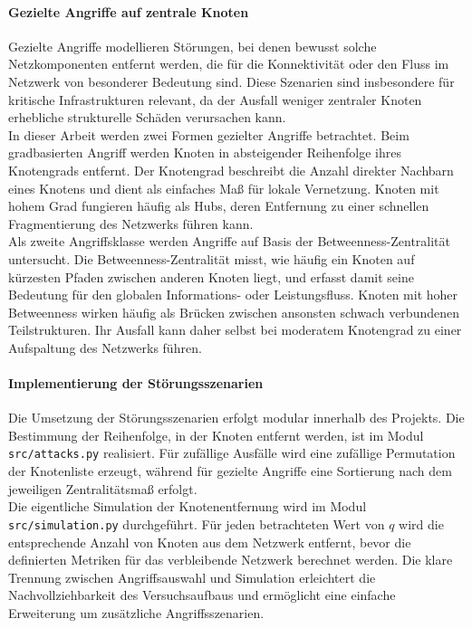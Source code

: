 \paragraph{Gezielte Angriffe auf zentrale Knoten}
Gezielte Angriffe modellieren Störungen, bei denen bewusst solche
Netzkomponenten entfernt werden, die für die Konnektivität oder den Fluss im
Netzwerk von besonderer Bedeutung sind. Diese Szenarien sind insbesondere für
kritische Infrastrukturen relevant, da der Ausfall weniger zentraler Knoten
erhebliche strukturelle Schäden verursachen kann.\\
In dieser Arbeit werden zwei Formen gezielter Angriffe betrachtet. Beim
gradbasierten Angriff werden Knoten in absteigender Reihenfolge ihres
Knotengrads entfernt. Der Knotengrad beschreibt die Anzahl direkter Nachbarn
eines Knotens und dient als einfaches Maß für lokale Vernetzung. Knoten mit
hohem Grad fungieren häufig als Hubs, deren Entfernung zu einer schnellen
Fragmentierung des Netzwerks führen kann.\\
Als zweite Angriffsklasse werden Angriffe auf Basis der Betweenness-Zentralität
untersucht. Die Betweenness-Zentralität misst, wie häufig ein
Knoten auf kürzesten Pfaden zwischen anderen Knoten liegt, und erfasst damit
seine Bedeutung für den globalen Informations- oder Leistungsfluss. Knoten mit
hoher Betweenness wirken häufig als Brücken zwischen ansonsten schwach
verbundenen Teilstrukturen. Ihr Ausfall kann daher selbst bei moderatem
Knotengrad zu einer Aufspaltung des Netzwerks führen.

\paragraph{Implementierung der Störungsszenarien}
Die Umsetzung der Störungsszenarien erfolgt modular innerhalb des Projekts.
Die Bestimmung der Reihenfolge, in der Knoten entfernt werden, ist im Modul
\texttt{src/attacks.py} realisiert. Für zufällige Ausfälle wird eine zufällige
Permutation der Knotenliste erzeugt, während für gezielte Angriffe eine
Sortierung nach dem jeweiligen Zentralitätsmaß erfolgt.\\
Die eigentliche Simulation der Knotenentfernung wird im Modul
\texttt{src/simulation.py} durchgeführt. Für jeden betrachteten Wert von $q$
wird die entsprechende Anzahl von Knoten aus dem Netzwerk entfernt, bevor die
definierten Metriken für das verbleibende Netzwerk berechnet werden. Die klare
Trennung zwischen Angriffsauswahl und Simulation erleichtert die
Nachvollziehbarkeit des Versuchsaufbaus und ermöglicht eine einfache
Erweiterung um zusätzliche Angriffsszenarien.


